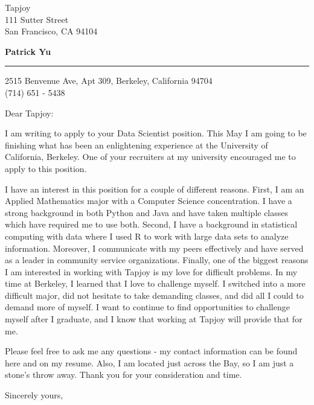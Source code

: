 \documentclass{letter} %
\begin{document}
\signature{Patrick Yu}           %
\longindentation=0pt                       %
\let\raggedleft\raggedright                %
 
 
\begin{letter}{
Tapjoy\\
111 Sutter Street\\
San Francisco, CA 94104}

\begin{flushleft}
{\large\bf Patrick Yu}
\end{flushleft}
\medskip\hrule height 1pt
\begin{flushright}
\hfill 2515 Benvenue Ave, Apt 309, Berkeley, California 94704 \\
\hfill (714) 651 - 5438
\end{flushright} 
\vfill %

 
\opening{Dear Tapjoy:} 
 
\noindent I am writing to apply to your Data Scientist position. This May I am going to be finishing what has been an enlightening experience at the University of California, Berkeley.  One of your recruiters at my university encouraged me to apply to this position.

\noindent I have an interest in this position for a couple of different reasons. First, I am an Applied Mathematics major with a Computer Science concentration. I have a strong background in both Python and Java and have taken multiple classes which have required me to use both. Second, I have a background in statistical computing with data where I used R to work with large data sets to analyze information. Moreover, I communicate with my peers effectively and have served as a leader in community service organizations. Finally, one of the biggest reasons I am interested in working with Tapjoy is my love for difficult problems. In my time at Berkeley, I learned that I love to challenge myself. I switched into a more difficult major, did not hesitate to take demanding classes, and did all I could to demand more of myself. I want to continue to find opportunities to challenge myself after I graduate, and I know that working at Tapjoy will provide that for me.

\noindent Please feel free to ask me any questions - my contact information can be found here and on my resume. Also, I am located just across the Bay, so I am just a stone's throw away. Thank you for your consideration and time.
 
\closing{Sincerely yours,} 
 

 

\end{letter}
 
\end{document}
